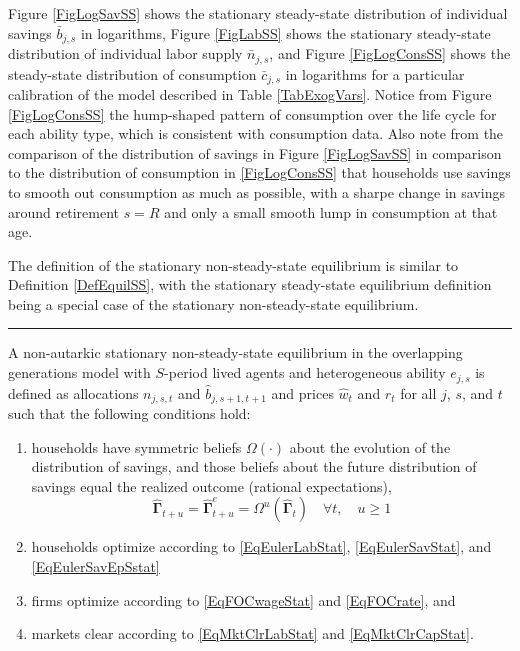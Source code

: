 \begin{spacing}{1.5}
    Figure \ref{FigLogSavSS} shows the stationary steady-state distribution of individual savings $\bar{b}_{j,s}$ in logarithms, Figure \ref{FigLabSS} shows the stationary steady-state distribution of individual labor supply $\bar{n}_{j,s}$, and Figure \ref{FigLogConsSS} shows the steady-state distribution of consumption $\bar{c}_{j,s}$ in logarithms for a particular calibration of the model described in Table \ref{TabExogVars}. Notice from Figure \ref{FigLogConsSS} the hump-shaped pattern of consumption over the life cycle for each ability type, which is consistent with consumption data. Also note from the comparison of the distribution of savings in Figure \ref{FigLogSavSS} in comparison to the distribution of consumption in \ref{FigLogConsSS} that households use savings to smooth out consumption as much as possible, with a sharpe change in savings around retirement $s=R$ and only a small smooth lump in consumption at that age.

    The definition of the stationary non-steady-state equilibrium is similar to Definition \ref{DefEquilSS}, with the stationary steady-state equilibrium definition being a special case of the stationary non-steady-state equilibrium.

    \vspace{7mm}
    \end{spacing}
    \hrule
    \begin{definition}\label{DefEquilNonSS}
      A non-autarkic stationary non-steady-state equilibrium in the overlapping generations model with $S$-period lived agents and heterogeneous ability $e_{j,s}$ is defined as allocations $n_{j,s,t}$ and $\hat{b}_{j,s+1,t+1}$ and prices $\hat{w}_t$ and $r_t$ for all $j$, $s$, and $t$ such that the following conditions hold:
       \begin{enumerate}
          \item households have symmetric beliefs $\Omega(\cdot)$ about the evolution of the distribution of savings, and those beliefs about the future distribution of savings equal the realized outcome (rational expectations),
            \begin{equation*}
              \bm{\hat{\Gamma}}_{t+u} = \bm{\hat{\Gamma}}^e_{t+u} = \Omega^u\left( \bm{\hat{\Gamma}}_t\right) \quad\forall t, \quad u\geq 1
            \end{equation*}
          \item households optimize according to \eqref{EqEulerLabStat}, \eqref{EqEulerSavStat}, and \eqref{EqEulerSavEpSstat}
          \item firms optimize according to \eqref{EqFOCwageStat} and \eqref{EqFOCrate}, and
          \item markets clear according to \eqref{EqMktClrLabStat} and \eqref{EqMktClrCapStat}.
       \end{enumerate}
    \end{definition}
